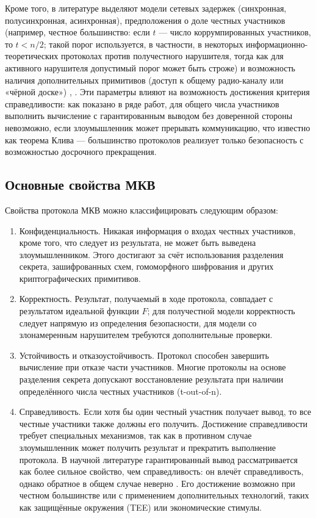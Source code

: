 Кроме того, в литературе выделяют модели сетевых задержек (синхронная, полусинхронная, асинхронная), предположения о доле честных участников (например, честное большинство: если \(t\) --- число коррумпированных участников, то \(t<n/2\); такой порог используется, в частности, в некоторых информационно-\allowbreak теоретических протоколах против получестного нарушителя, тогда как для активного нарушителя допустимый порог может быть строже) и возможность наличия дополнительных примитивов (доступ к общему радио-каналу или «чёрной доске») \cite{06}, \cite{08}. Эти параметры влияют на возможность достижения критерия справедливости: как показано в ряде работ, для общего числа участников выполнить вычисление с гарантированным выводом без доверенной стороны невозможно, если злоумышленник может прерывать коммуникацию, что известно как теорема Клива \cite{08} --- большинство протоколов реализует только безопасность с возможностью досрочного прекращения.

\subsection{Основные свойства МКВ}

Свойства протокола МКВ можно классифицировать следующим образом:

\begin{enumerate}
\item Конфиденциальность. Никакая информация о входах честных участников, кроме того, что следует из результата, не может быть выведена злоумышленником. Этого достигают за счёт использования разделения секрета, зашифрованных схем, гомоморфного шифрования и других криптографических примитивов.

\item Корректность. Результат, получаемый в ходе протокола, совпадает с результатом идеальной функции \(F\); для получестной модели корректность следует напрямую из определения безопасности, для модели со злонамеренным нарушителем требуются дополнительные проверки.

\item Устойчивость и отказоустойчивость. Протокол способен завершить вычисление при отказе части участников. Многие протоколы на основе разделения секрета допускают восстановление результата при наличии определённого числа честных участников (t-out-of-n).

\item Справедливость. Если хотя бы один честный участник получает вывод, то все честные участники также должны его получить. Достижение справедливости требует специальных механизмов, так как в противном случае злоумышленник может получить результат и прекратить выполнение протокола. В научной литературе гарантированный вывод рассматривается как более сильное свойство, чем справедливость: он влечёт справедливость, однако обратное в общем случае неверно \cite{24}. Его достижение возможно при честном большинстве или с применением дополнительных технологий, таких как защищённые окружения (TEE) или экономические стимулы.
\end{enumerate}


